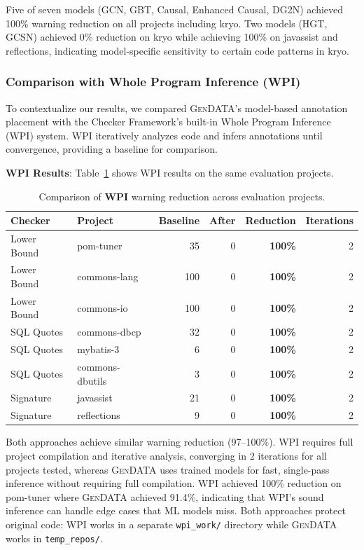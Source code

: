 \documentclass[acmsmall,screen,review,anonymous]{acmart}
\newcommand{\gendata}{\textsc{GenDATA}\xspace}
\newcommand{\cf}{Checker Framework\xspace}
\begin{document}
Five of seven models (GCN, GBT, Causal, Enhanced Causal, DG2N) achieved 100\% warning reduction on all projects including kryo. Two models (HGT, GCSN) achieved 0\% reduction on kryo while achieving 100\% on javassist and reflections, indicating model-specific sensitivity to certain code patterns in kryo.

\subsubsection{Comparison with Whole Program Inference (WPI)}
\label{sec:wpicomparison}

To contextualize our results, we compared \gendata's model-based annotation placement with the \cf's built-in Whole Program Inference (WPI) system. WPI iteratively analyzes code and infers annotations until convergence, providing a baseline for comparison.

\textbf{WPI Results}: Table~\ref{tab:wpi} shows WPI results on the same evaluation projects.

\begin{table}[t]
\caption{Comparison of \textbf{WPI} warning reduction across evaluation projects.}
\label{tab:wpi}
\begin{tabular}{llrrrr}
\toprule
\textbf{Checker} & \textbf{Project} & \textbf{Baseline} & \textbf{After} & \textbf{Reduction} & \textbf{Iterations} \\
\midrule
Lower Bound & pom-tuner & 35 & 0 & \textbf{100\%} & 2 \\
Lower Bound & commons-lang & 100 & 0 & \textbf{100\%} & 2 \\
Lower Bound & commons-io & 100 & 0 & \textbf{100\%} & 2 \\
\midrule
SQL Quotes & commons-dbcp & 32 & 0 & \textbf{100\%} & 2 \\
SQL Quotes & mybatis-3 & 6 & 0 & \textbf{100\%} & 2 \\
SQL Quotes & commons-dbutils & 3 & 0 & \textbf{100\%} & 2 \\
\midrule
Signature & javassist & 21 & 0 & \textbf{100\%} & 2 \\
Signature & reflections & 9 & 0 & \textbf{100\%} & 2 \\
\bottomrule
\end{tabular}
\end{table}

Both approaches achieve similar warning reduction (97--100\%). WPI requires full project compilation and iterative analysis, converging in 2 iterations for all projects tested, whereas \gendata uses trained models for fast, single-pass inference without requiring full compilation. WPI achieved 100\% reduction on pom-tuner where \gendata achieved 91.4\%, indicating that WPI's sound inference can handle edge cases that ML models miss. Both approaches protect original code: WPI works in a separate \texttt{wpi\_work/} directory while \gendata works in \texttt{temp\_repos/}.
\end{document}
